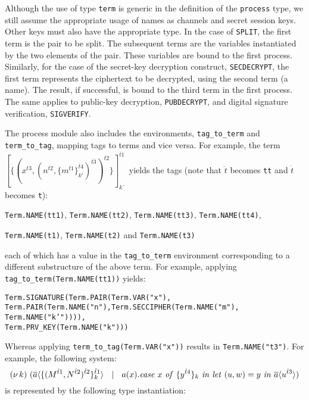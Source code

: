 \documentclass[10pt,a4paper,final,oneside,fleqn]{book}
\begin{document}
\noindent
Although the use of type \texttt{term} is generic in the definition of the \texttt{process} type, we still assume the appropriate usage of names as channels and secret session keys.  Other keys must also have the appropriate type.  In the case of \texttt{SPLIT}, the first term is the pair to be split.  The subsequent terms are the variables instantiated by the two elements of the pair.  These variables are bound to the first process.  Similarly, for the case of the secret-key decryption construct, \texttt{SECDECRYPT}, the first term represents the ciphertext to be decrypted, using the second term (a name).  The result, if successful, is bound to the third term in the first process.  The same applies to public-key decryption, \texttt{PUBDECRYPT}, and digital signature verification, \texttt{SIGVERIFY}.

The process module also includes the environments, \texttt{tag\_to\_term} and \texttt{term\_to\_tag}, mapping tags to terms and vice versa.  For example, the term $[\!\{(x^{\dot{t3}},(n^{\dot{t2}},\{m^{\dot{t1}}\}_{k'}^{\ddot{t4}})^{\ddot{t3}})^{\ddot{t2}}\}\!]_{k^-}^{\ddot{t1}}$ yields the tags (note that $\ddot{t}$ becomes \texttt{tt} and $\dot{t}$ becomes \texttt{t}):\vspace{4mm}

\noindent
\texttt{Term.NAME(tt1)}, \texttt{Term.NAME(tt2)}, \texttt{Term.NAME(tt3)}, \texttt{Term.NAME(tt4)},

\noindent
\texttt{Term.NAME(t1)}, \texttt{Term.NAME(t2)} and \texttt{Term.NAME(t3)}\vspace{4mm}

\noindent
each of which has a value in the \texttt{tag\_to\_term} environment corresponding to a different substructure of the above term.  For example, applying \texttt{tag\_to\_term(Term.NAME(tt1))} yields:\vspace{6mm}

\noindent
\texttt{Term.SIGNATURE(Term.PAIR(Term.VAR("x"),}\\
\texttt{Term.PAIR(Term.NAME("n"),Term.SECCIPHER(Term.NAME("m"), Term.NAME("k'")))),}\\\texttt{Term.PRV\_KEY(Term.NAME("k")))}\vspace{6mm}

\noindent
Whereas applying \texttt{term\_to\_tag(Term.VAR("x"))} results in \texttt{Term.NAME("t3")}.  For example, the following system:
\[(\nu~\!k)~(\overline{a}\langle\{(M^{\dot{t}1},N^{\dot{t}2})^{\ddot{t}2}\}^{\ddot{t}1}_{k}\rangle~~\mid~~a(x).\mbox{{\itshape case\/} }x\mbox{ {\itshape of\/} }\{y^{\dot{t}4}\}_k\mbox{ {\itshape in\/} }\mbox{{\itshape let\/} }(u,w)=y\mbox{ {\itshape in\/} }\overline{a}\langle u^{\dot{t}3}\rangle)\]
\noindent
is represented by the following type instantiation:\vspace{6mm}
\end{document}
